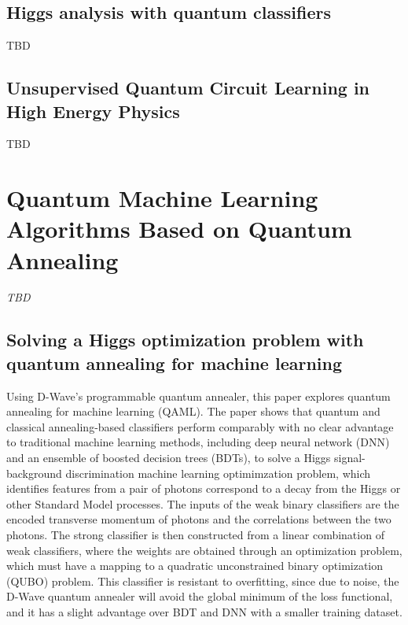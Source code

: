 \subsection{Higgs analysis with quantum classifiers~\cite{Belis:2021zqi}}
TBD
\subsection{Unsupervised Quantum Circuit Learning in High Energy Physics~\cite{Delgado:2022aty}}
TBD


\section{Quantum Machine Learning Algorithms Based on Quantum Annealing}

\textit{TBD}

\subsection{Solving a Higgs optimization problem with quantum annealing for machine learning~\cite{Mott:2017xdb}}
Using D-Wave's programmable quantum annealer, this paper explores quantum annealing for machine learning (QAML). The paper shows that quantum and classical annealing-based classifiers perform comparably with no clear advantage to traditional machine learning methods, including deep neural network (DNN) and an ensemble of boosted decision trees (BDTs), to solve a Higgs signal-background discrimination machine learning optimimzation problem, which identifies features from a pair of photons correspond to a decay from the Higgs or other Standard Model processes. The inputs of the weak binary classifiers are the encoded transverse momentum of photons and the correlations between the two photons. The strong classifier is then constructed from a linear combination of weak classifiers, where the weights are obtained through an optimization problem, which must have a mapping to a quadratic unconstrained binary optimization (QUBO) problem. This classifier is resistant to overfitting, since due to noise, the D-Wave quantum annealer will avoid the global minimum of the loss functional, and it has a slight advantage over BDT and DNN with a smaller training dataset.
